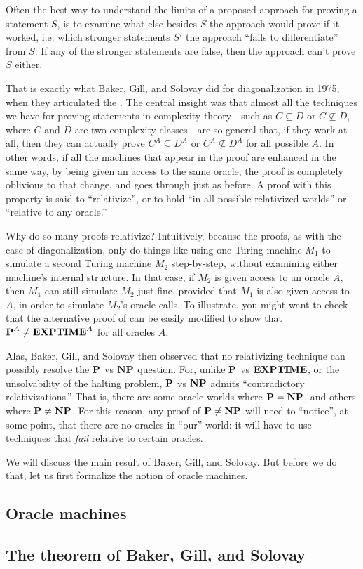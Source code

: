 \documentclass[11pt,twoside=off,numbers=noenddot]{scrbook}
\begin{document}
Often the best way to understand the limits of a proposed approach for proving a statement $S$, is to examine what else besides $S$ the approach would prove if it worked, i.e. which stronger statements $S'$ the approach ``fails to differentiate'' from $S$. If any of the stronger statements are false, then the approach can't prove $S$ either.

That is exactly what Baker, Gill, and Solovay \cite{baker1975relativizations} did for diagonalization in 1975, when they articulated the . The central insight was that almost all the techniques we have for proving statements in complexity theory—such as $C \subseteq D$ or $C \not\subseteq D$, where $C$ and $D$ are two complexity classes—are so general that, if they work at all, then they can actually prove $C^A \subseteq D^A$ or $C^A \not\subseteq D^A$ for all possible  $A$. In other words, if all the machines that appear in the proof are enhanced in the same way, by being given an access to the same oracle, the proof is completely oblivious to that change, and goes through just as before. A proof with this property is said to ``relativize'', or to hold ``in all possible relativized worlds'' or ``relative to any oracle.''

Why do so many proofs relativize? Intuitively, because the proofs, as with the case of diagonalization, only do things like using one Turing machine $M_1$ to simulate a second Turing machine $M_2$ step-by-step, without examining either machine's internal structure. In that case, if $M_2$ is given access to an oracle $A$, then $M_1$ can still simulate $M_2$ just fine, provided that $M_1$ is also given access to $A$, in order to simulate $M_2$'s oracle calls. To illustrate, you might want to check that the alternative proof of  can be easily modified to show that $\textbf{P}^A \neq \textbf{EXPTIME}^A$ for all oracles $A$.

Alas, Baker, Gill, and Solovay then observed that no relativizing technique can possibly resolve the $\textbf{P}$ vs $\textbf{NP}$ question. For, unlike $\textbf{P}$ vs $\textbf{EXPTIME}$, or the unsolvability of the halting problem, $\textbf{P}$ vs $\textbf{NP}$ admits ``contradictory relativizations.'' That is, there are some oracle worlds where $\textbf{P} = \textbf{NP}$, and others where $\textbf{P} \neq \textbf{NP}$. For this reason, any proof of $\textbf{P} \neq \textbf{NP}$ will need to ``notice'', at some point, that there are no oracles in ``our'' world: it will have to use techniques that \emph{fail} relative to certain oracles.

We will discuss the main result of Baker, Gill, and Solovay. But before we do that, let us first formalize the notion of oracle machines.

\subsection{Oracle machines}

\subsection{The theorem of Baker, Gill, and Solovay}

\printbibliography[nottype=image]
\end{document}
